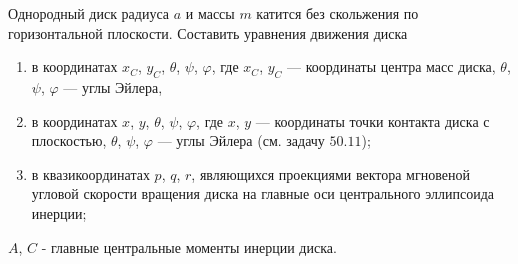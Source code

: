 Однородный диск радиуса $a$ и массы $m$ катится
без скольжения по горизонтальной плоскости.
Составить уравнения движения диска
\begin{enumerate}
\item в координатах $x_C$, $y_C$, $\theta$, $\psi$, $\varphi$,
где $x_C$, $y_C$ --- координаты центра масс диска,
$\theta$, $\psi$, $\varphi$ --- углы Эйлера,
\item в координатах $x$, $y$, $\theta$, $\psi$, $\varphi$, где $x$, $y$ ---
координаты точки контакта диска с плоскостью,
$\theta$, $\psi$, $\varphi$ --- углы Эйлера (см. задачу $50.11$);
\item в квазикоординатах $p$, $q$, $r$, являющихся проекциями вектора
мгновеной угловой скорости вращения диска на главные оси центрального
эллипсоида инерции;
\end{enumerate}
$A$, $C$ - главные центральные моменты инерции диска.
